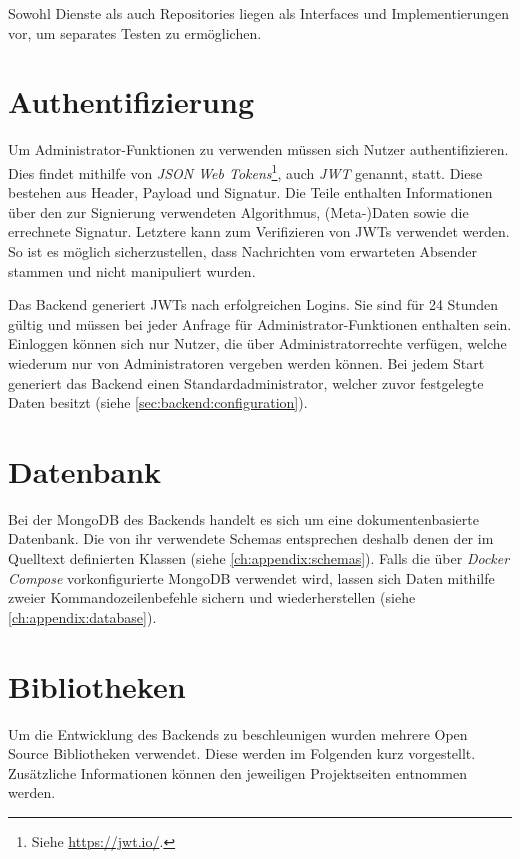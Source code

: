 Sowohl Dienste als auch Repositories liegen als Interfaces und Implementierungen vor, um separates Testen zu ermöglichen.

\section{Authentifizierung}
\label{sec:backend:authentication}
Um Administrator-Funktionen zu verwenden müssen sich Nutzer authentifizieren.
Dies findet mithilfe von \textit{JSON Web Tokens}\footnote{Siehe \url{https://jwt.io/}.}, auch \textit{JWT} genannt, statt.
Diese bestehen aus Header, Payload und Signatur.
Die Teile enthalten Informationen über den zur Signierung verwendeten Algorithmus, (Meta-)Daten sowie die errechnete Signatur.
Letztere kann zum Verifizieren von JWTs verwendet werden.
So ist es möglich sicherzustellen, dass Nachrichten vom erwarteten Absender stammen und nicht manipuliert wurden.

Das Backend generiert JWTs nach erfolgreichen Logins.
Sie sind für 24 Stunden gültig und müssen bei jeder Anfrage für Administrator-Funktionen enthalten sein.
Einloggen können sich nur Nutzer, die über Administratorrechte verfügen, welche wiederum nur von Administratoren vergeben werden können.
Bei jedem Start generiert das Backend einen Standard\-administrator, welcher zuvor festgelegte Daten besitzt (siehe \autoref{sec:backend:configuration}).

\section{Datenbank}
\label{sec:backend:database}
Bei der MongoDB des Backends handelt es sich um eine dokumentenbasierte Datenbank.
Die von ihr verwendete Schemas entsprechen deshalb denen der im Quelltext definierten Klassen (siehe \autoref{ch:appendix:schemas}).
Falls die über \textit{Docker Compose} vorkonfigurierte MongoDB verwendet wird, lassen sich Daten mithilfe zweier Kommandozeilenbefehle sichern und wiederherstellen (siehe \autoref{ch:appendix:database}).

\section{Bibliotheken}
\label{sec:backend:bibs}
Um die Entwicklung des Backends zu beschleunigen wurden mehrere Open Source Bibliotheken verwendet.
Diese werden im Folgenden kurz vorgestellt.
Zusätzliche Informationen können den jeweiligen Projektseiten entnommen werden.


